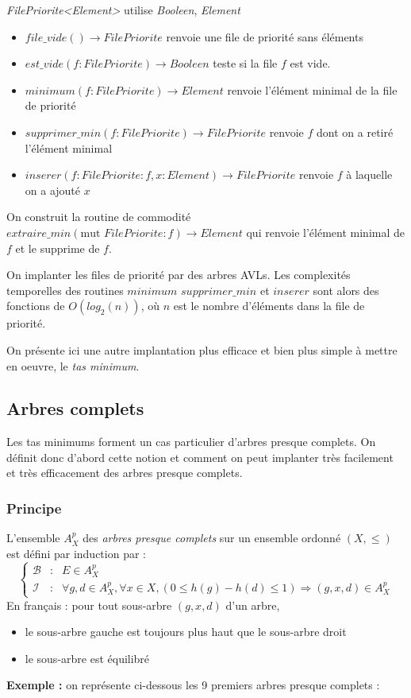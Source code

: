 \documentclass[../../../main.tex]{subfiles}
\begin{document}
\textit{FilePriorite\textless{}Element\textgreater} utilise \textit{Booleen}, \textit{Element}
\begin{itemize}
	\item $file\_vide()\rightarrow FilePriorite$ renvoie une file de priorité sans éléments
	\item $est\_vide(f:FilePriorite)\rightarrow Booleen$ teste si la file $f$ est vide.
	\item $minimum(f:FilePriorite)\rightarrow Element$ renvoie l'élément minimal de la file de priorité
	\item $supprimer\_min(f:FilePriorite)\rightarrow FilePriorite$ renvoie $f$ dont on a retiré l'élément minimal
	\item $inserer(f:FilePriorite:f, x:Element)\rightarrow FilePriorite$ renvoie $f$ à laquelle on a ajouté $x$
\end{itemize}
On construit la routine de commodité $extraire\_min(\text{mut }FilePriorite:f)\rightarrow Element$ qui renvoie l'élément minimal de $f$ et le supprime de $f$.

On implanter les files de priorité par des arbres AVLs. Les complexités temporelles des routines $minimum$ $supprimer\_min$ et $inserer$ sont alors des fonctions de $O(log_2(n))$, où $n$ est le nombre d'éléments dans la file de priorité.

On présente ici une autre implantation plus efficace et bien plus simple à mettre en oeuvre, le \textit{tas minimum}.
\subsection{Arbres complets}
Les tas minimums forment un cas particulier d'arbres presque complets. On définit donc d'abord cette notion et comment on peut implanter très facilement et très efficacement des arbres presque complets.
\subsubsection{Principe}
 {
	L'ensemble $A^p_X$ des \textit{arbres presque complets} sur un ensemble ordonné $(X, \leq)$ est défini par induction par :
	$$\left\{\begin{array}{cll}
	\mathcal{B} & : & E\in A^p_X \\
	\mathcal{I} & : & \forall g, d\in A^p_X, \forall x\in X, (0 \leq h(g) - h(d) \leq 1) \Rightarrow (g, x, d)\in A^p_X
\end{array}\right.$$
	En français : pour tout sous-arbre $(g, x, d)$ d'un arbre,
	\begin{itemize}
		\item le sous-arbre gauche est toujours plus haut que le sous-arbre droit
		\item le sous-arbre est équilibré
	\end{itemize}
}
\textbf{Exemple :} on représente ci-dessous les 9 premiers arbres presque complets :
\end{document}
